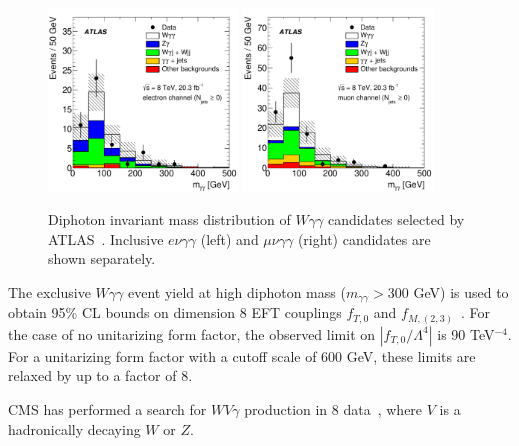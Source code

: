 \begin{figure}[p]
    \centering
    \includegraphics[width=0.45\textwidth]{figures/ss-inclboson-triboson-wgg-ele-atlas8tev.pdf}
    \includegraphics[width=0.45\textwidth]{figures/ss-inclboson-triboson-wgg-mu-atlas8tev.pdf}
    \caption{Diphoton invariant mass distribution of $W\gamma\gamma$ candidates selected by ATLAS~\cite{Aad:2015uqa}.  Inclusive $e\nu\gamma\gamma$ (left) and $\mu\nu\gamma\gamma$ (right) candidates are shown separately.}
    \label{fig:ss-inclboson-triboson-wgg-atlas8tev}
\end{figure}

The exclusive $W\gamma\gamma$ event yield at high diphoton mass
($m_{\gamma\gamma} > 300$ GeV) is used to obtain 95\% CL bounds on
dimension 8 EFT couplings $f_{T,0}$ and
$f_{M,(2,3)}$~\cite{Eboli:2006wa}.  For the case of no unitarizing
form factor, the observed limit on $|f_{T,0}/\Lambda^4|$ is 90
TeV$^{-4}$.  For a unitarizing form factor with a cutoff scale of 600
GeV, these limits are relaxed by up to a factor of 8.

CMS has performed a search for $WV\gamma$ production in 8 \TeV
data~\cite{Chatrchyan:2014bza}, where $V$ is a hadronically decaying
$W$ or $Z$.

